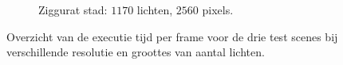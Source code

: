 \begin{figure}[p]
\begin{adjustbox}{minipage=\textwidth, scale=0.6}
\begin{subfigure}[b]{0.83\textwidth}
      \label{fig:fds-test-frames:city-low}
    \end{subfigure}
  \end{adjustbox} %
  \begin{adjustbox}{minipage=\textwidth, scale=0.6}
    \begin{subfigure}[b]{0.83\textwidth}
      \centering
      \def\svgwidth{\textwidth}
      
      \caption{Ziggurat stad: $1170$ lichten, $2560$ pixels.}
      \label{fig:fds-test-frames:city-high}
    \end{subfigure}
  \end{adjustbox}
  \caption{Overzicht van de executie tijd per frame voor de drie test scenes
           bij verschillende resolutie en groottes van aantal lichten.}
  \label{fig:fds-test-frames}
\end{figure}

